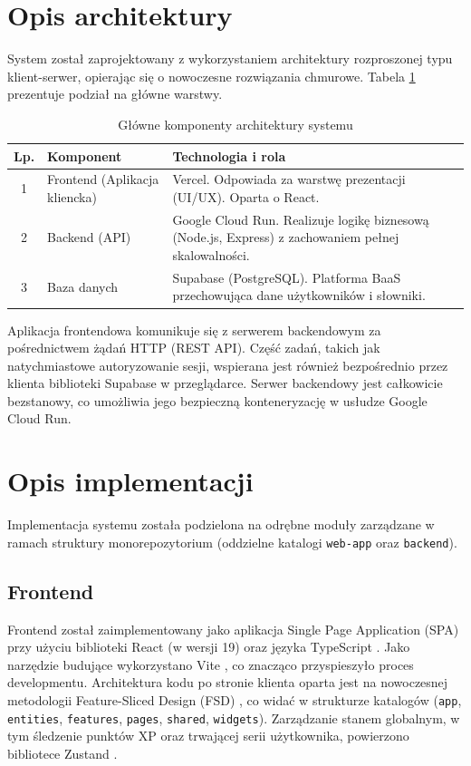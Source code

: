\documentclass[times]{san}
\begin{document}
\section{Opis architektury}

System został zaprojektowany z wykorzystaniem architektury rozproszonej typu klient-serwer, opierając się o nowoczesne rozwiązania chmurowe. Tabela \ref{tab:architektura} prezentuje podział na główne warstwy.

\begin{table}[h]
\centering
\caption{Główne komponenty architektury systemu}
\label{tab:architektura}
\begin{tabular}{|c|p{4cm}|p{8cm}|}
\hline
Lp. & Komponent          & Technologia i rola \\
\hline
1   & Frontend (Aplikacja kliencka) & Vercel. Odpowiada za warstwę prezentacji (UI/UX). Oparta o React. \\
2   & Backend (API)      & Google Cloud Run. Realizuje logikę biznesową (Node.js, Express) z zachowaniem pełnej skalowalności. \\
3   & Baza danych        & Supabase (PostgreSQL). Platforma BaaS przechowująca dane użytkowników i słowniki. \\
\hline
\end{tabular}
\end{table}

Aplikacja frontendowa komunikuje się z serwerem backendowym za pośrednictwem żądań HTTP (REST API). Część zadań, takich jak natychmiastowe autoryzowanie sesji, wspierana jest również bezpośrednio przez klienta biblioteki Supabase w przeglądarce. Serwer backendowy jest całkowicie bezstanowy, co umożliwia jego bezpieczną konteneryzację w usłudze Google Cloud Run.

\section{Opis implementacji}

Implementacja systemu została podzielona na odrębne moduły zarządzane w ramach struktury monorepozytorium (oddzielne katalogi \texttt{web-app} oraz \texttt{backend}). 

\subsection{Frontend}
Frontend został zaimplementowany jako aplikacja Single Page Application (SPA) przy użyciu biblioteki React \cite{react} (w wersji 19) oraz języka TypeScript \cite{ts}. Jako narzędzie budujące wykorzystano Vite \cite{vite}, co znacząco przyspieszyło proces developmentu. Architektura kodu po stronie klienta oparta jest na nowoczesnej metodologii Feature-Sliced Design (FSD) \cite{fsd}, co widać w strukturze katalogów (\texttt{app}, \texttt{entities}, \texttt{features}, \texttt{pages}, \texttt{shared}, \texttt{widgets}). Zarządzanie stanem globalnym, w tym śledzenie punktów XP oraz trwającej serii użytkownika, powierzono bibliotece Zustand \cite{zustand}.
\end{document}
